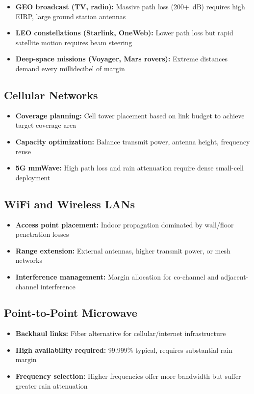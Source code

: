 \begin{itemize}
\item \textbf{GEO broadcast (TV, radio):} Massive path loss (200+~dB) requires high EIRP, large ground station antennas
\item \textbf{LEO constellations (Starlink, OneWeb):} Lower path loss but rapid satellite motion requires beam steering
\item \textbf{Deep-space missions (Voyager, Mars rovers):} Extreme distances demand every millidecibel of margin
\end{itemize}

\subsection{Cellular Networks}

\begin{itemize}
\item \textbf{Coverage planning:} Cell tower placement based on link budget to achieve target coverage area
\item \textbf{Capacity optimization:} Balance transmit power, antenna height, frequency reuse
\item \textbf{5G mmWave:} High path loss and rain attenuation require dense small-cell deployment
\end{itemize}

\subsection{WiFi and Wireless LANs}

\begin{itemize}
\item \textbf{Access point placement:} Indoor propagation dominated by wall/floor penetration losses
\item \textbf{Range extension:} External antennas, higher transmit power, or mesh networks
\item \textbf{Interference management:} Margin allocation for co-channel and adjacent-channel interference
\end{itemize}

\subsection{Point-to-Point Microwave}

\begin{itemize}
\item \textbf{Backhaul links:} Fiber alternative for cellular/internet infrastructure
\item \textbf{High availability required:} 99.999\% typical, requires substantial rain margin
\item \textbf{Frequency selection:} Higher frequencies offer more bandwidth but suffer greater rain attenuation
\end{itemize}

